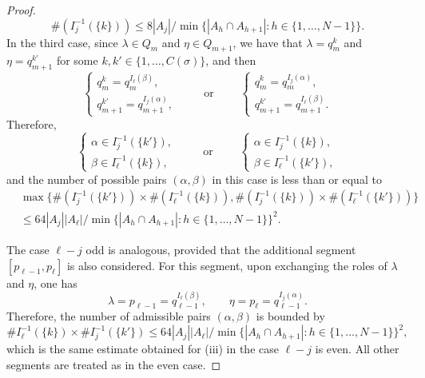 \documentclass[10pt,a4paper]{amsart}
\newcommand{\s}{\sigma}
\begin{document}
\begin{proof}
\begin{equation*}
    \#(I_j^{-1}(\{k\})) \leq  8|A_j|/\min\{|A_h\cap A_{h+1}| :  h\in\{1,\dots, N-1\}\}.
\end{equation*}
In the third case, since $\lambda\in Q_m$ and $\eta\in Q_{m+1}$, we have that $\lambda=q_m^k$ and $\eta=q_{m+1}^{k'}$ for some $k,k'\in\{1,\dots, C(\s)\}$, and then
\begin{equation*}
  \begin{cases}
      q_m^k=q_m^{I_\ell(\beta)}, \\[3pt]
      q_{m+1}^{k'}=q_{m+1}^{I_j(\alpha)},
  \end{cases}\qquad \text{ or } \qquad  
  \begin{cases}
q_m^k=q_{m}^{I_j(\alpha)}, \\[3pt]
q_{m+1}^{k'}=q_{m+1}^{I_\ell(\beta)}.
  \end{cases}
\end{equation*}
Therefore,
\begin{equation*}
\begin{cases}
   \alpha\in I_j^{-1}(\{k'\}), \\
   \beta \in I_\ell^{-1}(\{k\}), 
\end{cases}
    \qquad \text{ or } \qquad
    \begin{cases}
        \alpha\in I_j^{-1}(\{k\}),\\ \beta \in I_\ell^{-1}(\{k'\}),
    \end{cases} 
\end{equation*}
and the number of possible pairs $(\alpha,\beta)$ in this case is less than or equal to 
\begin{align*}
   & \max\{\#(I_j^{-1}(\{k'\}))\times \#(I_\ell^{-1}(\{k\})), \#(I_j^{-1}(\{k\}))\times \#(I_\ell^{-1}(\{k'\}))\} \\ &\leq64|A_j||A_\ell|/\min\{|A_h\cap A_{h+1}| :  h\in\{1,\dots, N-1\}\}^2.
\end{align*}

The case $\ell-j$ odd is analogous, provided that the additional segment $[p_{\ell-1},p_\ell]$ is also considered.
For this segment, upon exchanging the roles of $\lambda$ and $\eta$, one has
\[
\lambda=p_{\ell-1}=q_{\ell-1}^{I_\ell(\beta)},\qquad
\eta=p_\ell=q_{\ell-1}^{I_j(\alpha)}.
\]
Therefore, the number of admissible pairs $(\alpha,\beta)$ is bounded by
\[
\#I_\ell^{-1}(\{k\})\times\# I_j^{-1}(\{k'\})
\leq
64|A_j||A_\ell|/
\min\{|A_h\cap A_{h+1}|:h \in \{1,\dots,N-1\}\}^2,
\]
which is the same estimate obtained for (iii) in the case $\ell-j$ is even. All other segments are treated as in the even case.


\end{proof}
\end{document}
